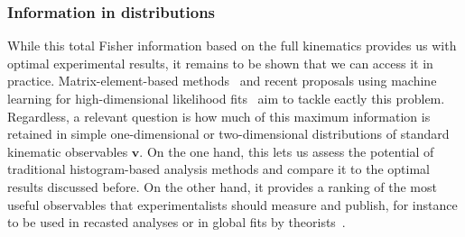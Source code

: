 \subsubsection{Information in distributions}

While this total Fisher information based on the full kinematics
provides us with optimal experimental results, it remains to be shown
that we can access it in practice. Matrix-element-based
methods~\cite{Kondo:1988yd, Abazov:2004cs, Gao:2010qx, Alwall:2010cq,
  Avery:2012um, Andersen:2012kn, Campbell:2013hz, Artoisenet:2013vfa,
  Martini:2015fsa, Gritsan:2016hjl, Soper:2011cr, Soper:2012pb,
  Soper:2014rya, Atwood:1991ka, Davier:1992nw, Diehl:1993br} and
recent proposals using machine learning for high-dimensional
likelihood fits~\cite{Cranmer:2015bka, Cranmer:2016lzt} aim to tackle
eactly this problem.  Regardless, a relevant question is how much of
this maximum information is retained in simple one-dimensional or
two-dimensional distributions of standard kinematic observables
$\mathbf{v}$. On the one hand, this lets us assess the potential of
traditional histogram-based analysis methods and compare it to the
optimal results discussed before. On the other hand, it provides a
ranking of the most useful observables that experimentalists should
measure and publish, for instance to be used in recasted analyses or
in global fits by theorists~\cite{Corbett:2015ksa, Butter:2016cvz}.

